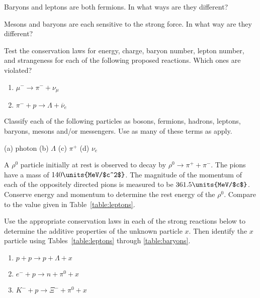 \begin{problem}
Baryons and leptons are both fermions.  In what ways are they
  different?
\label{prob:baryons_vs_leptons}
\end{problem}

\begin{problem}
Mesons and baryons are each sensitive to the strong force.  In
  what way are they different?
\label{prob:mesons_vs_baryons}
\end{problem}

\begin{problem}
Test the conservation laws for energy, charge, baryon number,
  lepton number, and strange\-ness %
for each
  of the following proposed reactions.  Which ones are violated?
  \begin{enumerate}
  \item $\mu^- \to \pi^- + \nu_\mu$
  \item $\pi^- + p \to \Lambda + \overline\nu_e$
  \end{enumerate}
\label{prob:conservation_laws_i}
\end{problem}


\begin{problem}
Classify each of the following particles as bosons, fermions,
  hadrons, leptons, baryons, mesons and/or messengers.  Use as many of
  these terms as apply.\par\medskip
  (a) photon \qquad \qquad
  (b) $\Lambda$ \qquad \qquad
  (c) $\pi^+$ \qquad \qquad
  (d) $\nu_e$
\label{prob:classify_particles}
\end{problem}

\begin{problem}
A $\rho^0$ particle initially at rest is observed to decay by
  $\rho^0 \to \pi^+ + \pi^-$.  The pions have a mass of 
  $140\units{MeV/$c^2$}$.  The magnitude of the momentum of each 
  of the oppositely directed pions is measured to be 
  $361.5\units{MeV/$c$}$.  Conserve energy
  and momentum to determine the rest energy of the $\rho^0$.  Compare
  to the value given in Table~\ref{table:leptons}.
\label{prob:rho0_rest_energy}
\end{problem}

\begin{problem}
Use the appropriate conservation laws in each of the strong
  reactions below to determine the additive properties of the unknown
  particle $x$.  Then identify the $x$ particle using
  Tables~\ref{table:leptons} through \ref{table:baryons}.
  \begin{enumerate}
  \item $p + p \to p + \Lambda + x$
  \item $e^- + p \to n + \pi^0 + x$
  \item $K^- + p \to \Xi^- + \pi^0 + x$
  \end{enumerate}
\label{prob:identify_particle_x}
\end{problem}

